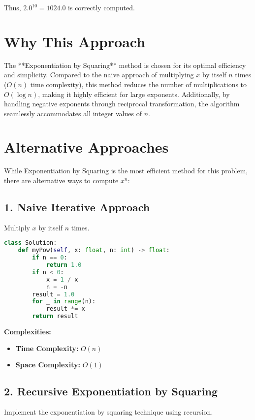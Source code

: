 Thus, \(2.0^{10} = 1024.0\) is correctly computed.

\section*{Why This Approach}

The **Exponentiation by Squaring** method is chosen for its optimal efficiency and simplicity. Compared to the naive approach of multiplying \(x\) by itself \(n\) times (\(O(n)\) time complexity), this method reduces the number of multiplications to \(O(\log n)\), making it highly efficient for large exponents. Additionally, by handling negative exponents through reciprocal transformation, the algorithm seamlessly accommodates all integer values of \(n\).

\section*{Alternative Approaches}

While Exponentiation by Squaring is the most efficient method for this problem, there are alternative ways to compute \(x^n\):

\subsection*{1. Naive Iterative Approach}

Multiply \(x\) by itself \(n\) times.

\begin{lstlisting}[language=Python]
class Solution:
    def myPow(self, x: float, n: int) -> float:
        if n == 0:
            return 1.0
        if n < 0:
            x = 1 / x
            n = -n
        result = 1.0
        for _ in range(n):
            result *= x
        return result
\end{lstlisting}

\textbf{Complexities:}
\begin{itemize}
    \item \textbf{Time Complexity:} \(O(n)\)
    \item \textbf{Space Complexity:} \(O(1)\)
\end{itemize}

\subsection*{2. Recursive Exponentiation by Squaring}

Implement the exponentiation by squaring technique using recursion.

